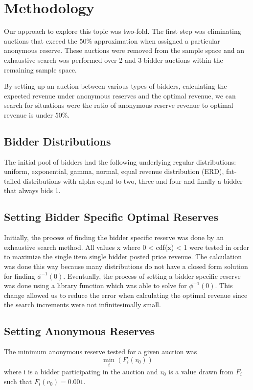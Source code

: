 \documentclass{acm_proc_article-sp}
\begin{document}
\section{Methodology}
Our approach to explore this topic was two-fold. The first step was eliminating auctions that exceed the 50\% approximation when assigned a particular anonymous reserve. These auctions were removed from the sample space and an exhaustive search was performed over 2 and 3 bidder auctions within the remaining sample space.




By setting up an auction between various types of bidders, calculating the expected revenue under anonymous reserves and the optimal revenue, we can search for situations were the ratio of anonymous reserve revenue to optimal revenue is under 50\%.

\subsection{Bidder Distributions}
The initial pool of bidders had the following underlying regular distributions: uniform, exponential, gamma, normal, equal revenue distribution (ERD), fat-tailed distributions with alpha equal to two, three and four and finally a bidder that always bids 1. 

\subsection{Setting Bidder Specific Optimal Reserves}

Initially, the process of finding the  bidder specific reserve was done by an exhaustive search method. All values x where 0 < cdf(x) < 1 were tested in order to maximize the single item single bidder posted price revenue. The calculation was done this way because many distributions do not have a closed form solution for finding $\phi^{-1}(0)$. Eventually, the process of setting a bidder specific reserve was done using a library function which was able to solve for $\phi^{-1}(0)$. This change allowed us to reduce the error when calculating the optimal revenue since the search increments were not infinitesimally small.

\subsection{Setting Anonymous Reserves}
	The minimum anonymous reserve tested for a given auction was \[\min_{i}(F_i(v_0))\] where i is a bidder participating in the auction and $v_0$ is a value drawn from $F_i$ such that $F_i(v_0) = 0.001$.
	
\end{document}
